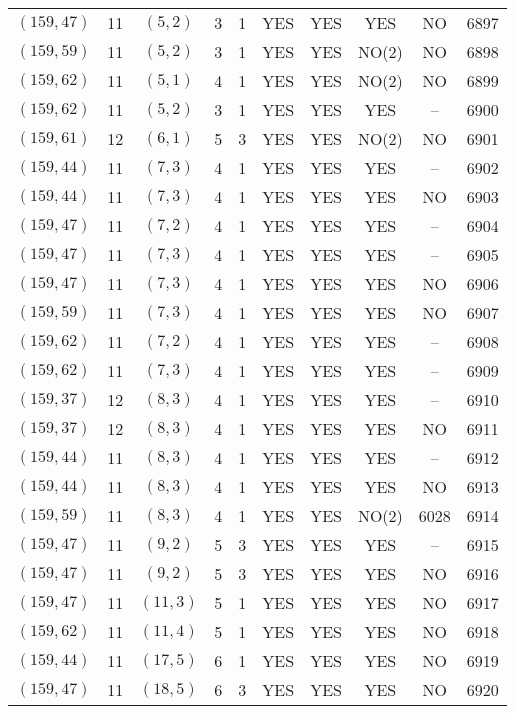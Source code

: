 \begin{longtable}{|c|c|c|c|c|c|c|c|c|c|}
$(159, 47)$ & 11 & $(5, 2)$ & 3 & 1 & YES & YES & YES & NO & 6897\\
$(159, 59)$ & 11 & $(5, 2)$ & 3 & 1 & YES & YES & NO(2) & NO & 6898\\
$(159, 62)$ & 11 & $(5, 1)$ & 4 & 1 & YES & YES & NO(2) & NO & 6899\\
$(159, 62)$ & 11 & $(5, 2)$ & 3 & 1 & YES & YES & YES & -- & 6900\\
$(159, 61)$ & 12 & $(6, 1)$ & 5 & 3 & YES & YES & NO(2) & NO & 6901\\
$(159, 44)$ & 11 & $(7, 3)$ & 4 & 1 & YES & YES & YES & -- & 6902\\
$(159, 44)$ & 11 & $(7, 3)$ & 4 & 1 & YES & YES & YES & NO & 6903\\
$(159, 47)$ & 11 & $(7, 2)$ & 4 & 1 & YES & YES & YES & -- & 6904\\
$(159, 47)$ & 11 & $(7, 3)$ & 4 & 1 & YES & YES & YES & -- & 6905\\
$(159, 47)$ & 11 & $(7, 3)$ & 4 & 1 & YES & YES & YES & NO & 6906\\
$(159, 59)$ & 11 & $(7, 3)$ & 4 & 1 & YES & YES & YES & NO & 6907\\
$(159, 62)$ & 11 & $(7, 2)$ & 4 & 1 & YES & YES & YES & -- & 6908\\
$(159, 62)$ & 11 & $(7, 3)$ & 4 & 1 & YES & YES & YES & -- & 6909\\
$(159, 37)$ & 12 & $(8, 3)$ & 4 & 1 & YES & YES & YES & -- & 6910\\
$(159, 37)$ & 12 & $(8, 3)$ & 4 & 1 & YES & YES & YES & NO & 6911\\
$(159, 44)$ & 11 & $(8, 3)$ & 4 & 1 & YES & YES & YES & -- & 6912\\
$(159, 44)$ & 11 & $(8, 3)$ & 4 & 1 & YES & YES & YES & NO & 6913\\
$(159, 59)$ & 11 & $(8, 3)$ & 4 & 1 & YES & YES & NO(2) & 6028 & 6914\\
$(159, 47)$ & 11 & $(9, 2)$ & 5 & 3 & YES & YES & YES & -- & 6915\\
$(159, 47)$ & 11 & $(9, 2)$ & 5 & 3 & YES & YES & YES & NO & 6916\\
$(159, 47)$ & 11 & $(11, 3)$ & 5 & 1 & YES & YES & YES & NO & 6917\\
$(159, 62)$ & 11 & $(11, 4)$ & 5 & 1 & YES & YES & YES & NO & 6918\\
$(159, 44)$ & 11 & $(17, 5)$ & 6 & 1 & YES & YES & YES & NO & 6919\\
$(159, 47)$ & 11 & $(18, 5)$ & 6 & 3 & YES & YES & YES & NO & 6920\\

\end{longtable}
